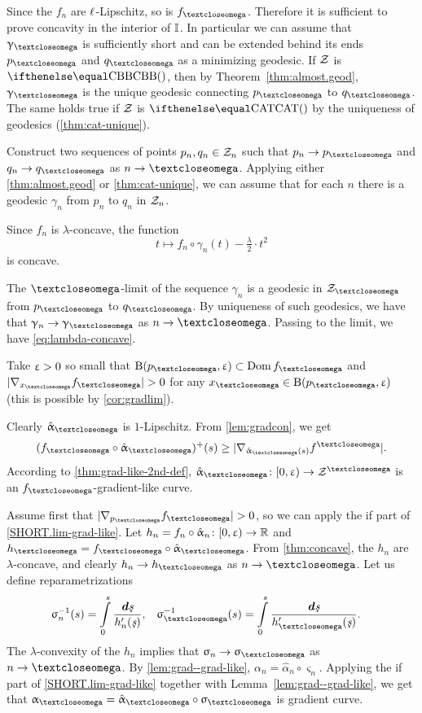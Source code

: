Since the $f_n$ are ${\ell}$-Lipschitz, so is $f_\o$.
Therefore it is sufficient to prove concavity in the interior of $\mathbb{I}$.
In particular we can assume that $\gamma_\o$ is sufficiently short and can be extended behind its ends $p_\o$ and $q_\o$ as a minimizing geodesic.
If $\mathcal{Z}$ is $\Alex{}$, then by Theorem~\ref{thm:almost.geod}, $\gamma_\o$ is the unique geodesic connecting $p_\o$ to $q_\o$.
The same holds true if $\mathcal{Z}$ is $\CAT{}$ by the uniqueness of geodesics (\ref{thm:cat-unique}).

Construct two sequences of points $p_n,q_n\in\spc{Z}_n$ such that $p_n\to p_\o$ and $q_n\to q_\o$ as $n\to \o$.
Applying either \ref{thm:almost.geod} or \ref{thm:cat-unique},
we can assume that for each $n$ there is a geodesic $\gamma_n$ from $p_n$ to $q_n$ in $\mathcal{Z}_n$.

Since $f_n$ is $\lambda$-concave, the function 
\[t\mapsto f_n\circ\gamma_n(t)-\tfrac\lambda 2\cdot t^2\]
is concave.

The $\o$-limit of the sequence $\gamma_n$ is a geodesic in $\spc{Z}_\o$ from $p_\o$ to $q_\o$.
By uniqueness of such geodesics, we have that $\gamma_n\to \gamma_\o$ as $n\to \o$.
Passing to the limit, we have \ref{eq:lambda-concave}.

Take $\upvarepsilon>0$ so small that $\oBall(p_\o,\eps)\subset\Dom f_\o$ and $|\nabla_{x_\o}f_\o|\z>0$ for any $x_\o\in\oBall(p_\o,\eps)$ (this is possible by \ref{cor:gradlim}).

Clearly $\hat\alpha_\o$ is $1$-Lipschitz.
From \ref{lem:gradcon}, we get 
\[(f_\o\circ\hat\alpha_\o)^+(s)
\ge
|\nabla_{\hat\alpha_\o(s)}f^\o|.\]
According to \ref{thm:grad-like-2nd-def}, $\hat\alpha_\o\:[0,\eps)\to \spc{Z}^\o$  is an $f_\o$-gradient-like curve.

Assume first that $|\nabla_{p_\o}f_\o|>0$, 
so we can apply the if part of \ref{SHORT.lim-grad-like}.
Let $h_n=f_n\circ\hat\alpha_n\:[0,\eps)\to \RR$ 
and $h_\o=f_\o\circ\hat\alpha_\o$.
From \ref{thm:concave}, the $h_n$ are $\lambda$-concave, and clearly $h_n\to h_\o$ as $n\to\o$.
Let us define reparametrizations
\begin{align*}
{\varsigma_n^{-1}(s)}
&=
\int\limits_0^{s}\frac{\dd\under s}{h_n'(\under s)},
&
{\varsigma_\o^{-1}(s)}
&=
\int\limits_0^{s}\frac{\dd\under s}{h_\o'(\under s)}.
\end{align*}
The $\lambda$-convexity of the $h_n$ implies that $\sigma_n\to\sigma_\o$ as $n\to\o$.
By \ref{lem:grad--grad-like}, 
$\alpha_n=\hat\alpha_n\circ\varsigma_n$.
Applying the if part of \ref{SHORT.lim-grad-like} together with Lemma~\ref{lem:grad--grad-like},
we get that $\alpha_\o=\hat\alpha_\o\circ\varsigma_\o$ is gradient curve.

